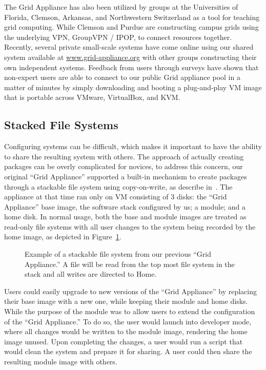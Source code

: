 \documentclass[conference]{IEEEtran}
\begin{document}
The Grid Appliance has also been utilized by groups at the Universities of
Florida, Clemson, Arkansas, and Northwestern Switzerland as a tool for teaching
grid computing.  While Clemson and Purdue are constructing campus grids using
the underlying VPN, GroupVPN / IPOP, to connect resources together.  Recently,
several private small-scale systems have come online using our shared system
available at \url{www.grid-appliance.org} with other groups constructing their
own independent systems.  Feedback from users through surveys have shown that
non-expert users are able to connect to our public Grid appliance pool in a
matter of minutes by simply downloading and booting a plug-and-play VM image
that is portable across VMware, VirtualBox, and KVM.

\subsection{Stacked File Systems}

Configuring systems can be difficult, which makes it important to have the
ability to share the resulting system with others.  The approach of actually
creating packages can be overly complicated for novices, to address this
concern, our original ``Grid Appliance'' supported a built-in mechanism to
create packages through a stackable file system using copy-on-write, as
describe in~\cite{vtdc}.  The appliance at that time ran only on VM consisting
of 3 disks: the ``Grid Appliance'' base image, the software stack configured by
us; a module; and a home disk.  In normal usage, both the base and module
images are treated as read-only file systems with all user changes to the
system being recorded by the home image, as depicted in
Figure~\ref{fig:stackfs}.

\begin{figure}[ht]
\centering
{}
\caption{Example of a stackable file system from our previous ``Grid
Appliance.''  A file will be read from the top most file system in the stack
and all writes are directed to Home.}
\label{fig:stackfs}
\end{figure}

Users could easily upgrade to new versions of the ``Grid Appliance'' by
replacing their base image with a new one, while keeping their module and home
disks.  While the purpose of the module was to allow users to extend the
configuration of the ``Grid Appliance.''  To do so, the user would launch into
developer mode, where all changes would be written to the module image,
rendering the home image unused.  Upon completing the changes, a user would run
a script that would clean the system and prepare it for sharing.  A user could
then share the resulting module image with others.
\end{document}
